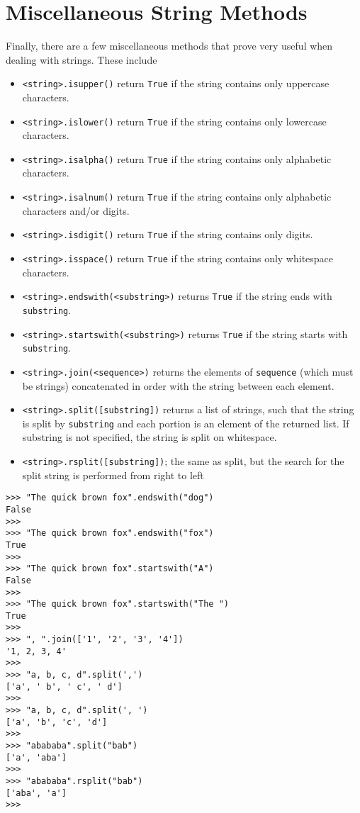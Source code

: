 \section{Miscellaneous String Methods}

Finally, there are a few miscellaneous methods that prove very   useful when dealing with strings. These include
\begin{itemize}
	\item 
\texttt{<string>.isupper()} return \texttt{True} if the string    contains only uppercase characters.
	\item 
\texttt{<string>.islower()} return \texttt{True} if the string    contains only lowercase characters.
	\item 
\texttt{<string>.isalpha()} return \texttt{True} if the string    contains only alphabetic characters.
	\item 
\texttt{<string>.isalnum()} return \texttt{True} if the string    contains only alphabetic characters and/or digits.
	\item 
\texttt{<string>.isdigit()} return \texttt{True} if the string    contains only digits.
	\item 
\texttt{<string>.isspace()} return \texttt{True} if the string    contains only whitespace characters.
	\item 
\texttt{<string>.endswith(<substring>)} returns    \texttt{True} if the string ends with \texttt{substring}.
	\item 
\texttt{<string>.startswith(<substring>)}    returns \texttt{True} if the string starts with \texttt{substring}.
	\item 
\texttt{<string>.join(<sequence>)} returns the    elements of \texttt{sequence} (which must be strings) concatenated in    order with the string between each element.
	\item 
\texttt{<string>.split([substring])} returns a list    of strings, such that the string is split by \texttt{substring} and each    portion is an element of the returned list. If substring is not    specified, the string is split on whitespace.
	\item 
\texttt{<string>.rsplit([substring])}; the same as    split, but the search for the split string is performed from right    to left
\end{itemize}
\begin{lstlisting}
>>> "The quick brown fox".endswith("dog")
False
>>>
>>> "The quick brown fox".endswith("fox")
True
>>>
>>> "The quick brown fox".startswith("A")
False
>>>
>>> "The quick brown fox".startswith("The ")
True
>>>
>>> ", ".join(['1', '2', '3', '4'])
'1, 2, 3, 4'
>>> 
>>> "a, b, c, d".split(',')
['a', ' b', ' c', ' d']
>>>
>>> "a, b, c, d".split(', ')
['a', 'b', 'c', 'd']
>>> 
>>> "abababa".split("bab")
['a', 'aba']
>>>
>>> "abababa".rsplit("bab")
['aba', 'a']
>>>
\end{lstlisting}

